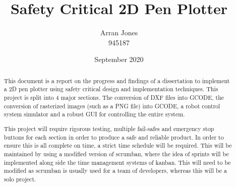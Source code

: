 \documentclass[11pt, a4paper, twoside, openright]{custard}
\begin{document}
	
	\title{Safety Critical 2D Pen Plotter}
	\author{Arran Jones\protect\\{\normalsize 945187}}
	
	
	
	\date{September 2020}
	
	\frontmatter%
	\maketitle
	\declaration
	\cleardoublepage
	

	\begin{abstract}
		\vspace{-2em}
		\setcounter{page}{1}
		
		This document is a report on the progress and findings of a dissertation to implement a 2D pen plotter using safety critical design and implementation techniques. This project is split into 4 major sections. The conversion of DXF files into GCODE, the conversion of rasterized images (such as a PNG file) into GCODE, a robot control system simulator and a robust GUI for controlling the entire system. 
		
		This project will require rigorous testing, multiple fail-safes and emergency stop buttons for each section in order to produce a safe and reliable product. In order to ensure this is all complete on time, a strict time schedule will be required. This will be maintained by using a modified version of scrumban, where the idea of sprints will be implemented along side the time management systems of kanban. This will need to be modified as scrumban is usually used for a team of developers, whereas this will be a solo project.

	\end{abstract}
	
\end{document}
